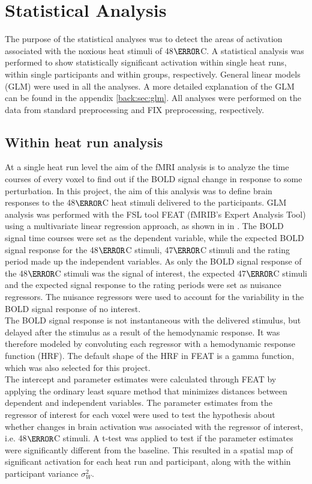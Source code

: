 \section{Statistical Analysis}\label{sec:stats}

The purpose of the statistical analyses was to detect the areas of activation associated with the noxious heat stimuli of 48$\degree$C. A statistical analysis was performed to show statistically significant activation within single heat runs, within single participants and within groups, respectively. General linear models (GLM) were used in all the analyses. A more detailed explanation of the GLM can be found in the appendix \ref{back:sec:glm}. All analyses were performed on the data from standard preprocessing and FIX preprocessing, respectively.

\subsection{Within heat run analysis}
At a single heat run level the aim of the fMRI analysis is to analyze the time courses of every voxel to find out if the BOLD signal change in response to some perturbation. In this project, the aim of this analysis was to define brain responses to the 48$\degree$C heat stimuli delivered to the participants. GLM analysis was performed with the FSL tool FEAT (fMRIB’s Expert Analysis Tool) using a multivariate linear regression approach, as shown in  in . The BOLD signal time courses were set as the dependent variable, while the expected BOLD signal response for the 48$\degree$C stimuli, 47$\degree$C stimuli and the rating period made up the independent variables. As only the BOLD signal response of the 48$\degree$C stimuli was the signal of interest, the expected 47$\degree$C stimuli and the expected signal response to the rating periods were set as nuisance regressors. The nuisance regressors were used to account for the variability in the BOLD signal response of no interest. \\
The BOLD signal response is not instantaneous with the delivered stimulus, but delayed after the stimulus as a result of the hemodynamic response. It was therefore modeled by convoluting each regressor with a hemodynamic response function (HRF). The default shape of the HRF in FEAT is a  gamma function, which was also selected for this project. \\
The intercept and parameter estimates were calculated through FEAT by applying the ordinary least square method that minimizes distances between dependent and independent variables. The parameter estimates from the regressor of interest for each voxel were used to test the hypothesis about whether changes in brain activation was associated with the regressor of interest, i.e. 48$\degree$C stimuli. A t-test was applied to test if the parameter estimates were significantly different from the baseline. This resulted in a spatial map of significant activation for each heat run and participant, along with the within participant variance $\sigma_{W}^{2}$. \\
